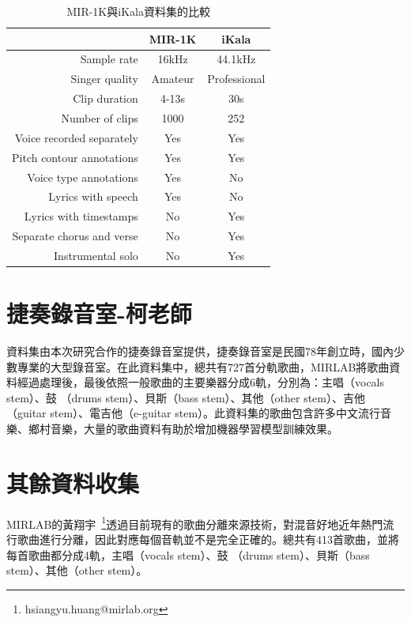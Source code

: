 \begin{table}[h!]
\centering
\begin{tabular}{|r|c|c|}
\hline
\textbf{}                 & \textbf{MIR-1K} & \textbf{iKala} \\ \hline
Sample rate               & 16kHz           & 44.1kHz        \\ \hline
Singer quality            & Amateur         & Professional   \\ \hline
Clip duration             & 4-13s           & 30s            \\ \hline
Number of clips           & 1000            & 252            \\ \hline
Voice recorded separately & Yes             & Yes            \\ \hline
Pitch contour annotations & Yes             & Yes            \\ \hline
Voice type annotations    & Yes             & No             \\ \hline
Lyrics with speech        & Yes             & No             \\ \hline
Lyrics with timestamps    & No              & Yes            \\ \hline
Separate chorus and verse & No              & Yes            \\ \hline
Instrumental solo         & No              & Yes            \\ \hline
\end{tabular}
\caption{MIR-1K與iKala資料集的比較}
\label{comp_mir_1k_with_ikala}
\end{table}

\section{捷奏錄音室-柯老師}
資料集由本次研究合作的捷奏錄音室提供，捷奏錄音室是民國78年創立時，國內少數專業的大型錄音室。在此資料集中，總共有727首分軌歌曲，MIRLAB將歌曲資料經過處理後，最後依照一般歌曲的主要樂器分成6軌，分別為：主唱（vocals stem）、鼓 （drums stem）、貝斯（bass stem）、其他（other stem）、吉他（guitar stem）、電吉他（e-guitar stem）。此資料集的歌曲包含許多中文流行音樂、鄉村音樂，大量的歌曲資料有助於增加機器學習模型訓練效果。

\section{其餘資料收集}
MIRLAB的黃翔宇~\footnote{hsiangyu.huang@mirlab.org}透過目前現有的歌曲分離來源技術，對混音好地近年熱門流行歌曲進行分離，因此對應每個音軌並不是完全正確的。總共有413首歌曲，並將每首歌曲都分成4軌，主唱（vocals stem）、鼓 （drums stem）、貝斯（bass stem）、其他（other stem）。